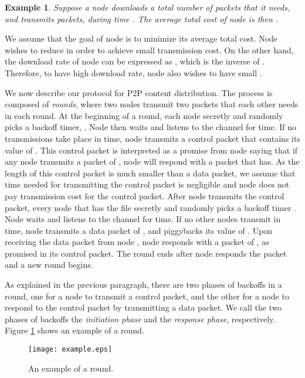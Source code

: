 \documentclass[11pt, conference]{IEEEtran}
\newtheorem{example}{Example}
\begin{document}
\begin{example}
Suppose a node  downloads a total number of  packets that it needs, and transmits  packets, during time . The average total cost of node  is then .
\end{example}

We assume that the goal of node  is to minimize its average total cost. Node  wishes to reduce  in order to achieve small transmission cost. On the other hand, the download rate of node  can be expressed as , which is the inverse of . Therefore, to have high download rate, node  also wishes to have small .

We now describe our protocol for P2P content distribution. The process is composed of \emph{rounds}, where  two nodes transmit two packets that each other needs in each round. At the beginning of a round, each node  secretly and randomly picks a backoff timer, . Node  then waits and listens to the channel for  time. If no transmissions take place in  time, node  transmits a control packet that contains its value of . This control packet is interpreted as a promise from node  saying that if any node transmits a packet of , node  will respond with a packet that  has. As the length of this control packet is much smaller than a data packet, we assume that time needed for transmitting the control packet is negligible and node  does not pay transmission cost for the control packet.  After node  transmits the control packet, every node  that has the file  secretly and randomly picks a backoff timer . Node  waits and listens to the channel for  time. If no other nodes transmit in  time, node  transmits a data packet of , and piggybacks its value of . Upon receiving the data packet from node , node  responds with a packet of , as promised in its control packet. The round ends after node  responds the packet and a new round begins.

As explained in the previous paragraph, there are two phases of backoffs in a round, one for a node to transmit a control packet, and the other for a node to respond to the control packet by transmitting a data packet. We call the two phases of backoffs the \emph{initiation phase} and the \emph{response phase}, respectively. Figure \ref{fig:model:example} shows an example of a round.

\begin{figure}[t]
\texttt{[image: example.eps]}
\caption{An example of a round.} \label{fig:model:example}
\end{figure}
\end{document}
